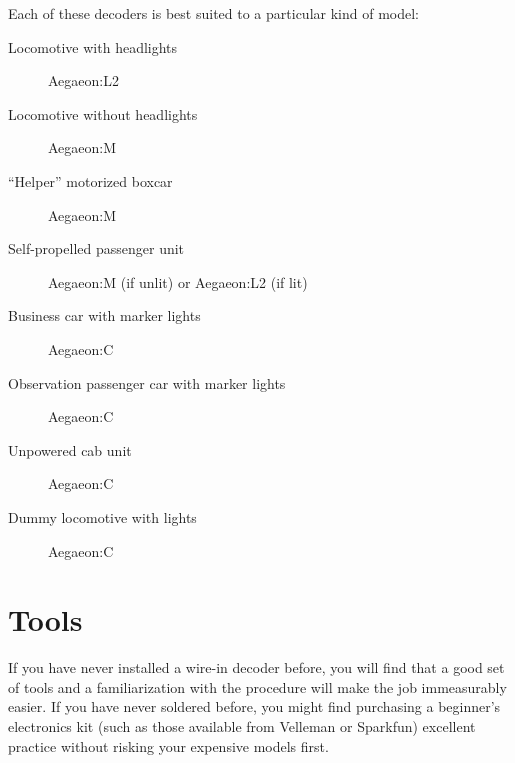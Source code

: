 \documentclass[12pt,letterpaper,draft]{memoir} %
\begin{document}
Each of these decoders is best suited to a particular kind of model:
\begin{description}
\item[Locomotive with headlights] Aegaeon:L2
\item[Locomotive without headlights] Aegaeon:M
\item[``Helper'' motorized boxcar] Aegaeon:M
\item[Self-propelled passenger unit] Aegaeon:M (if unlit) or Aegaeon:L2 (if lit)
\item[Business car with marker lights] Aegaeon:C
\item[Observation passenger car with marker lights] Aegaeon:C
\item[Unpowered cab unit] Aegaeon:C
\item[Dummy locomotive with lights] Aegaeon:C
\end{description}

\section{Tools}

If you have never installed a wire-in decoder before, you will find that a good set of tools and a familiarization with the procedure will make the job immeasurably easier. If you have never soldered before, you might find purchasing a beginner's electronics kit (such as those available from Velleman or Sparkfun) excellent practice without risking your expensive models first.
\end{document}
